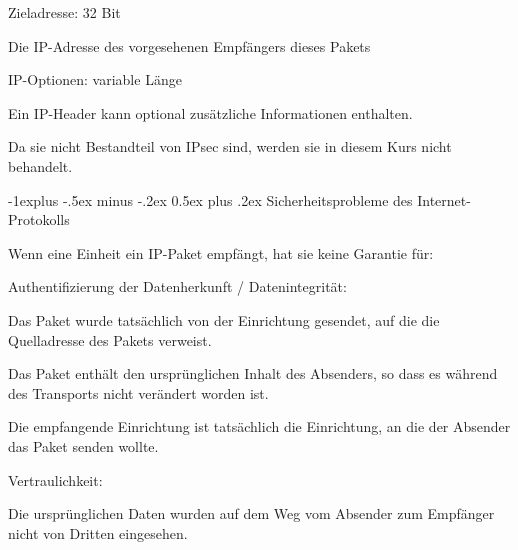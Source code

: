 \documentclass[a4paper]{article}
\makeatletter
\renewcommand{\subsection}{\@startsection{subsection}{2}{0mm}%
 {-1explus -.5ex minus -.2ex}%
 {0.5ex plus .2ex}%
 {\normalfont\normalsize\bfseries}}
\makeatother
\begin{document}
\begin{multicols}{3}
\begin{itemize*}
            \item Zieladresse: 32 Bit
            \begin{itemize*}
                  \item Die IP-Adresse des vorgesehenen Empfängers dieses Pakets
            \end{itemize*}
            \item IP-Optionen: variable Länge
            \begin{itemize*}
                  \item Ein IP-Header kann optional zusätzliche Informationen enthalten.
                  \item Da sie nicht Bestandteil von IPsec sind, werden sie in diesem Kurs nicht behandelt.
            \end{itemize*}
      \end{itemize*}

      \subsection{Sicherheitsprobleme des Internet-Protokolls}
      \begin{itemize*}
            \item Wenn eine Einheit ein IP-Paket empfängt, hat sie keine Garantie für:
            \begin{itemize*}
                  \item Authentifizierung der Datenherkunft / Datenintegrität:
                  \begin{itemize*}
                        \item Das Paket wurde tatsächlich von der Einrichtung gesendet, auf die die Quelladresse des Pakets verweist.
                        \item Das Paket enthält den ursprünglichen Inhalt des Absenders, so dass es während des Transports nicht verändert worden ist.
                        \item Die empfangende Einrichtung ist tatsächlich die Einrichtung, an die der Absender das Paket senden wollte.
                  \end{itemize*}
                  \item Vertraulichkeit:
                  \begin{itemize*}
                        \item Die ursprünglichen Daten wurden auf dem Weg vom Absender zum Empfänger nicht von Dritten eingesehen.
                  \end{itemize*}
            \end{itemize*}
      \end{itemize*}


\end{multicols}
\end{document}
